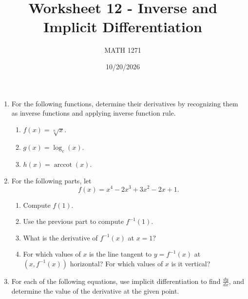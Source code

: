 \documentclass[12pt]{exam}
\title{Worksheet 12 - Inverse and Implicit Differentiation}
\author{MATH 1271}
\date{10/20/2026}
\begin{document}
\newpage
\maketitle

\begin{enumerate}

  \item For the following functions, determine their derivatives by recognizing them as inverse functions and applying inverse function rule.

    \begin{enumerate}
      \item $f(x) = \sqrt[n]{x}$.

        \vfill

      \item $g(x) = \log_c(x)$.
        \vfill

      \item $h(x) = \operatorname{arccot}(x)$.
        \vfill
    \end{enumerate}

    \newpage

  \item For the following parts, let
    \begin{equation*}
      f(x) = x^4 - 2x^3 + 3x^2 - 2x + 1.
    \end{equation*}

    \begin{enumerate}
      \item Compute $f(1)$.
        \vfill

      \item Use the previous part to compute $f^{-1}(1)$.
        \vfill

      \item What is the derivative of $f^{-1}(x)$ at $x = 1$?
        \vfill

      \item For which values of $x$ is the line tangent to $y = f^{-1}(x)$
        at $(x, f^{-1}(x))$ horizontal? For which values of $x$ is it vertical?
        \vfill
    \end{enumerate}

  \newpage

\item For each of the following equations, use implicit differentiation to find $\frac{dy}{dx}$, and determine the value of the derivative at the given point.

\begin{enumerate}


\end{enumerate}
\end{enumerate}
\end{document}
